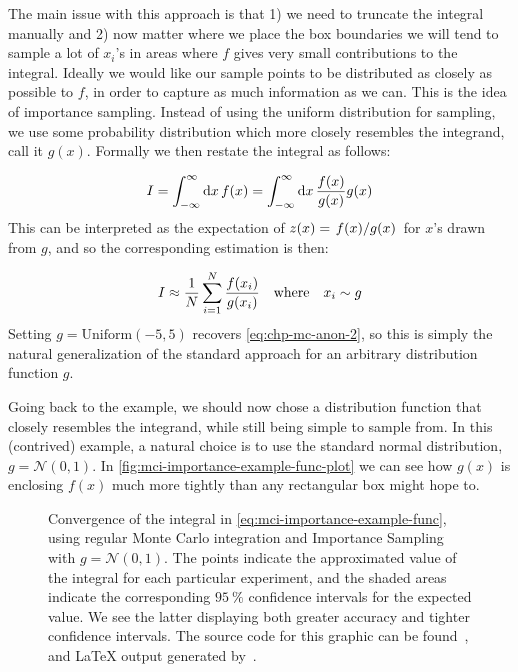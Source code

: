 \documentclass[Thesis.tex]{subfiles}
\begin{document}
The main issue with this approach is that 1) we need to truncate the integral
manually and 2) now matter where we place the box boundaries we will tend to
sample a lot of $x_i$'s in areas where $f$ gives very small contributions to
the integral. Ideally we would like our sample points to be distributed as
closely as possible to $f$, in order to capture as much information as we can.
This is the idea of importance sampling. Instead of using the uniform
distribution for sampling, we use some probability distribution which more
closely resembles the integrand, call it $g(x)$. Formally we then restate the integral as follows:

\begin{align}
    I = \int_{-\infty}^{\infty}\dd{x}f(x) = \int_{-\infty}^{\infty}\dd{x} \frac{f(x)}{g(x)} g(x)
\end{align}
This can be interpreted as the expectation of $z(x)=\flatfrac{f(x)}{g(x)}$ for $x$'s drawn from $g$, and so the corresponding estimation is then:

\begin{align}
    I \approx \frac{1}{N} \sum_{i=1}^N \frac{f(x_i)}{g(x_i)} \qq{where} x_i\sim g
\end{align}
Setting $g = \text{Uniform}(-5, 5)$ recovers \autoref{eq:chp-mc-anon-2}, so this is simply the natural generalization of the standard approach for an arbitrary distribution function $g$.


Going back to the example, we should now chose a distribution function that
closely resembles the integrand, while still being simple to sample from. In
this (contrived) example, a natural choice is to use the standard normal
distribution, $g = \mathcal{N}(0, 1)$. In
\autoref{fig:mci-importance-example-func-plot} we can see how $g(x)$ is
enclosing $f(x)$ much more tightly than any rectangular box might hope to.

\begin{figure}
   \centering
    \resizebox{0.7\linewidth}{!}{%
        
    }
    \caption{\label{fig:mci-importance-example-func-convergence}Convergence of
    the integral in \autoref{eq:mci-importance-example-func}, using regular
    Monte Carlo integration and Importance Sampling with $g = \mathcal{N}(0,
    1)$. The points indicate the approximated value of the integral for each
    particular experiment, and the shaded areas indicate the corresponding
    $\SI{95}{\percent}$ confidence intervals for the expected value. We see the
    latter displaying both greater accuracy and tighter confidence intervals.
    The source code for this graphic can be found~\cite[TODO: Add
    path]{MS-thesis-repository}, and \LaTeX{} output generated
    by~\cite{nico_schlomer_2018_1173090}.}
\end{figure}
\end{document}
